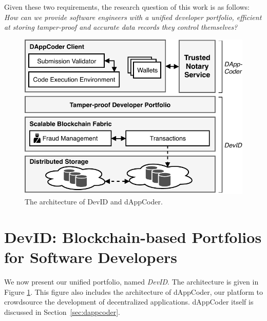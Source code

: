 Given these two requirements, the research question of this work is as follows:
\textit{How can we provide software engineers with a unified developer portfolio, efficient at storing tamper-proof and accurate data records they control themselves?}
\begin{figure}[t!]
	\includegraphics[width=\columnwidth]{devid/resources/architecture.pdf}
	\caption{The architecture of DevID and dAppCoder.}
	\label{fig:system_architecture}
\end{figure}

\section{DevID: Blockchain-based Portfolios for Software Developers}
\label{sec:devid_architecture}
We now present our unified portfolio, named \emph{DevID}.
The architecture is given in Figure \ref{fig:system_architecture}.
This figure also includes the architecture of dAppCoder, our platform to crowdsource the development of decentralized applications.
dAppCoder itself is discussed in Section~\ref{sec:dappcoder}.

